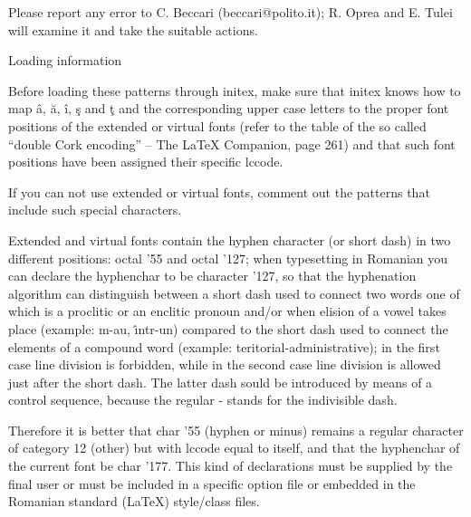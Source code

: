 Please report any error to C. Beccari (beccari@polito.it); R. Oprea and E.
Tulei will examine it and take the suitable actions.


Loading information

Before loading these patterns through  initex, make sure that initex knows
how to map \^a, \u{a}, \^i, \c{s} and \c{t} and  the  corresponding  upper
case letters to the proper font positions of the extended or virtual fonts
(refer to the table of the so called ``double Cork encoding'' -- The LaTeX
Companion, page 261) and that such font positions have been assigned their
specific lccode.

If  you  can  not  use extended or virtual fonts, comment out the patterns
that include such special characters.

Extended and virtual fonts contain the hyphen character (or short dash) in
two different positions:  octal  '55  and  octal '127; when typesetting in
Romanian you can declare the hyphenchar to be character '127, so that  the
hyphenation algorithm can distinguish between a short dash used to connect
two words one of which is a proclitic or an enclitic pronoun  and/or  when
elision  of a vowel takes place (example:  m-au, \^{\i}ntr-un) compared to
the short dash used to connect  the  elements of a compound word (example:
teritorial-administrative); in the first case line division is  forbidden,
while in the second case  line  division  is  allowed just after the short
dash.  The latter dash sould be introduced by means of a control sequence,
because the regular - stands for the indivisible dash.

Therefore it is better that char  '55  (hyphen or minus) remains a regular
character of category 12 (other) but with lccode equal to itself, and that
the  hyphenchar  of  the  current  font  be  char  '177.   This  kind   of
declarations  must  be supplied by the final user or must be included in a
specific  option  file  or  embedded  in  the  Romanian  standard  (LaTeX)
style/class files.

